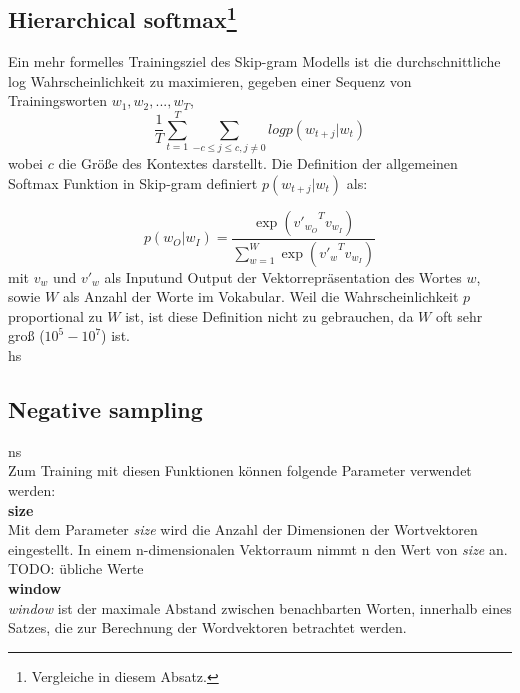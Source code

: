 \documentclass[12pt,a4paper]{report}
\begin{document}
\subsection*{Hierarchical softmax\footnote{Vergleiche \cite{DBLP:journals/corr/MikolovSCCD13} in diesem Absatz.}}
Ein mehr formelles Trainingsziel des Skip-gram Modells ist die durchschnittliche log Wahrscheinlichkeit zu maximieren, gegeben einer Sequenz von Trainingsworten $w_1, w_2,...,w_T$,\\
 \begin{equation}
\frac{1}{T} \sum_{t=1}^T \sum_{-c \le j \le c, j \neq 0} log p(w_{t+j}|w_t) 
  \end{equation}
  wobei $c$ die Größe des Kontextes darstellt. Die Definition der allgemeinen Softmax Funktion in Skip-gram definiert $p(w_{t+j}|w_t)$ als:
  
 \begin{equation}
p(w_O|w_I)=\frac{\exp({v'_{w_O}}^T v_{w_I}) }{\sum_{w=1}^W \exp({v'_w}^{T} v_{w_I})} 
  \end{equation}
  mit $v_w$ und $v'_w$ als \glqq Input\grqq und \glqq Output\grqq{} der Vektorrepräsentation des Wortes $w$, sowie $W$ als Anzahl der Worte im Vokabular. Weil die Wahrscheinlichkeit $p$ proportional zu $W$ ist, ist diese Definition nicht zu gebrauchen, da $W$ oft sehr groß ($10^5 - 10^7$) ist. \cite{DBLP:journals/corr/MikolovSCCD13}\\
  
  
  
hs\\

\subsection*{Negative sampling}

ns\\

Zum Training mit diesen Funktionen können folgende Parameter verwendet werden:\\

\textbf{size}
	\vspace{1em}\\
	Mit dem Parameter \textit{size} wird die Anzahl der Dimensionen der Wortvektoren eingestellt. In einem n-dimensionalen Vektorraum nimmt n den Wert von \textit{size} an.
	TODO: übliche Werte\\	
	
	\textbf{window}
	\vspace{1em}\\
	\textit{window} ist der maximale Abstand zwischen benachbarten Worten, innerhalb eines Satzes, die zur Berechnung der Wordvektoren betrachtet werden.\\
	
\end{document}
